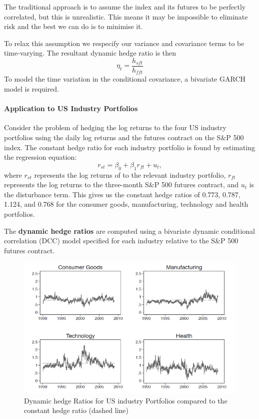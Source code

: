 \documentclass[11pt]{article}
\begin{document}
The traditional approach is to assume the index and its futures to be perfectly correlated, but this is unrealistic. This means it may be impossible to eliminate risk and the best we can do is to minimise it.

To relax this assumption we respecify our variance and covariance terms to be time-varying. The resultant dynamic hedge ratio is then
\[\eta_t = \dfrac{h_{sft}}{h_{fft}}\]
To model the time variation in the conditional covariance, a bivariate GARCH model is required.

\paragraph{Application to US Industry Portfolios} \mbox{}

Consider the problem of hedging the log returns to the four US industry portfolios using the daily log returns and the futures contract on the S\&P 500 index. The constant hedge ratio for each industry portfolio is found by estimating the regression equation:
\begin{equation}
    \label{constant hedge ratio}
    r_{st} = \beta_0 + \beta_1 r_{ft} + u_t,
\end{equation}
where $r_{st}$ represents the log returns of to the relevant industry portfolio, $r_{ft}$ represents the log returns to the three-month S\&P 500 futures contract, and $u_t$ is the disturbance term. This gives us the constant hedge ratios of 0.773, 0.787, 1.124, and 0.768 for the consumer goods, manufacturing, technology and health portfolios.

The \textbf{dynamic hedge ratios} are computed using a bivariate dynamic conditional correlation (DCC) model specified for each industry relative to the S\&P 500 futures contract.

\begin{figure}[h]
    \centering
    \includegraphics[width=12cm]{pics/DCC hedge ratios.png}
    \caption{Dynamic hedge Ratios for US industry Portfolios compared to the constant hedge ratio (dashed line)}
    \label{fig: dynamic hedge ratio}
\end{figure}
\end{document}
